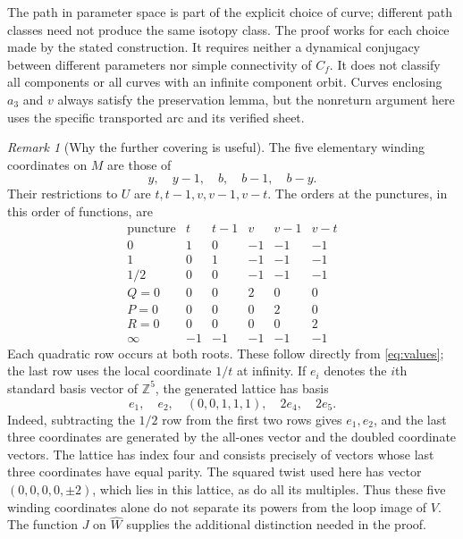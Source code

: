 \documentclass[11pt]{article}
\newcommand{\Z}{\mathbb Z}
\theoremstyle{remark}
\newtheorem{remark}[theorem]{Remark}
\begin{document}
The path in parameter space is part of the explicit choice of curve; different path classes need not produce the same isotopy class. The proof works for each choice made by the stated construction. It requires neither a dynamical conjugacy between different parameters nor simple connectivity of $C_f$. It does not classify all components or all curves with an infinite component orbit. Curves enclosing $a_3$ and $v$ always satisfy the preservation lemma, but the nonreturn argument here uses the specific transported arc and its verified sheet.

\begin{remark}[Why the further covering is useful]\label{rem:lattice}
The five elementary winding coordinates on $M$ are those of
\[
 y,\quad y-1,\quad b,\quad b-1,\quad b-y.
\]
Their restrictions to $U$ are $t,t-1,v,v-1,v-t$. The orders at the punctures, in this order of functions, are
\[
\begin{array}{c|rrrrr}
\text{puncture}&t&t-1&v&v-1&v-t\\ \hline
0&1&0&-1&-1&-1\\
1&0&1&-1&-1&-1\\
1/2&0&0&-1&-1&-1\\
Q=0&0&0&2&0&0\\
P=0&0&0&0&2&0\\
R=0&0&0&0&0&2\\
\infty&-1&-1&-1&-1&-1
\end{array}
\]
Each quadratic row occurs at both roots. These follow directly from \eqref{eq:values}; the last row uses the local coordinate $1/t$ at infinity. If $e_i$ denotes the $i$th standard basis vector of $\Z^5$, the generated lattice has basis
\[
 e_1,\quad e_2,\quad (0,0,1,1,1),\quad 2e_4,\quad 2e_5.
\]
Indeed, subtracting the $1/2$ row from the first two rows gives $e_1,e_2$, and the last three coordinates are generated by the all-ones vector and the doubled coordinate vectors. The lattice has index four and consists precisely of vectors whose last three coordinates have equal parity. The squared twist used here has vector $(0,0,0,0,\pm2)$, which lies in this lattice, as do all its multiples. Thus these five winding coordinates alone do not separate its powers from the loop image of $V$. The function $J$ on $\widehat W$ supplies the additional distinction needed in the proof.
\end{remark}
\end{document}
